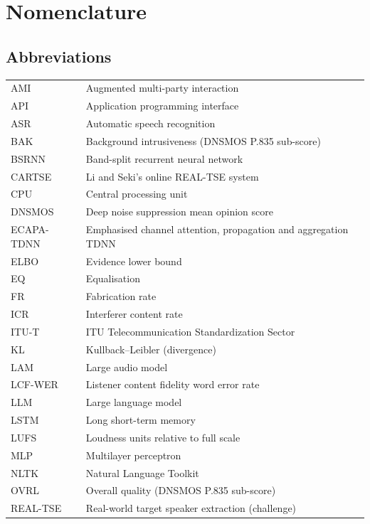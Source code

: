 \section*{Nomenclature}
{}

\subsection*{Abbreviations}
\begin{longtable}[l]{@{}ll@{}}
AMI & Augmented multi-party interaction \\
API & Application programming interface \\
ASR  & Automatic speech recognition \\
BAK & Background intrusiveness (DNSMOS P.835 sub-score) \\
BSRNN & Band-split recurrent neural network \\
CARTSE & Li and Seki's online REAL-TSE system \cite{li2026cartse} \\
CPU & Central processing unit \\
DNSMOS & Deep noise suppression mean opinion score \\
ECAPA-TDNN & Emphasised channel attention, propagation and aggregation TDNN \\
ELBO & Evidence lower bound \\
EQ & Equalisation \\
FR & Fabrication rate \\
ICR   & Interferer content rate \\
ITU-T & ITU Telecommunication Standardization Sector \\
KL & Kullback--Leibler (divergence) \\
LAM & Large audio model \\
LCF-WER & Listener content fidelity word error rate \\
LLM & Large language model \\
LSTM  & Long short-term memory \\
LUFS & Loudness units relative to full scale \\
MLP & Multilayer perceptron \\
NLTK & Natural Language Toolkit \\
OVRL & Overall quality (DNSMOS P.835 sub-score) \\
REAL-TSE & Real-world target speaker extraction (challenge) \\

\end{longtable}
